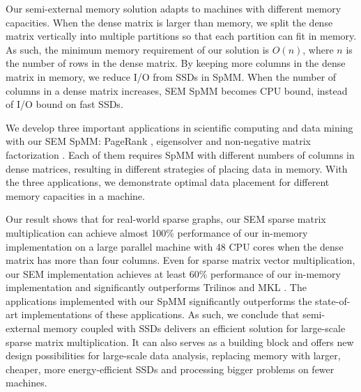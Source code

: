 Our semi-external memory solution adapts to machines with different memory
capacities. When the dense matrix is larger than memory, we split the dense
matrix vertically into multiple partitions so that each partition can fit in
memory. As such, the minimum memory requirement of our solution is $O(n)$,
where $n$ is the number of rows in the dense matrix. By keeping more columns
in the dense matrix in memory, we reduce I/O from SSDs in SpMM. When the number
of columns in a dense matrix increases, SEM SpMM becomes CPU bound, instead of
I/O bound on fast SSDs.

We develop three important applications in scientific computing and data mining
with our SEM SpMM: PageRank \cite{pagerank}, eigensolver \cite{anasazi} and
non-negative matrix factorization \cite{nmf}. Each of them requires SpMM with
different numbers of columns in dense matrices, resulting in different
strategies of placing data in memory.
With the three applications, we demonstrate optimal data placement for
different memory capacities in a machine.


Our result shows that for real-world sparse graphs, our SEM sparse matrix
multiplication can achieve almost 100\% performance of our in-memory implementation
on a large parallel machine with 48 CPU cores
when the dense matrix has more than four columns. Even for sparse matrix vector
multiplication, our SEM implementation achieves at least 60\% performance of
our in-memory implementation and significantly outperforms Trilinos \cite{trilinos}
and MKL \cite{mkl}. The applications implemented with our SpMM significantly
outperforms the state-of-art implementations of these applications. As such,
we conclude that semi-external memory coupled with SSDs delivers an efficient
solution for large-scale sparse matrix multiplication. It can also serves
as a building block and offers new design possibilities for large-scale
data analysis, replacing memory with larger, cheaper, more energy-efficient SSDs
and processing bigger problems on fewer machines.
